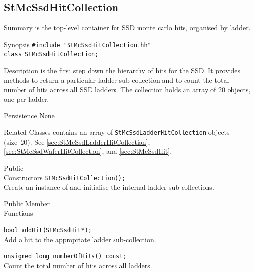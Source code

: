 \subsection{StMcSsdHitCollection}
 
\label{sec:StMcSsdHitCollection}
\begin{Entry}
\item[Summary]
     is the top-level container for SSD monte
    carlo hits, organised by ladder.

\item[Synopsis]
    \verb+#include "StMcSsdHitCollection.hh"+\\
    \verb+class StMcSsdHitCollection;+\\

\item[Description]
     is the first step down the hierarchy of hits
    for the SSD.  It provides methods to return a particular ladder
    sub-collection and to count the total number of hits across all SSD
    ladders.  The collection holds an array of 20
     objects, one per ladder.

\item[Persistence]
    None

\item[Related Classes]
     contains an array of
    {\tt StMcSsdLadderHitCollection} objects (size~20).  See
     \ref{sec:StMcSsdLadderHitCollection},
     \ref{sec:StMcSsdWaferHitCollection},
    and  \ref{sec:StMcSsdHit}.

\item[Public\\ Constructors]
    \verb+StMcSsdHitCollection();+\\
    Create an instance of  and
    initialise the internal ladder sub-collections.

\item[Public Member\\ Functions]

    \verb+bool addHit(StMcSsdHit*);+\\
    Add a hit to the appropriate ladder sub-collection.

    \verb+unsigned long numberOfHits() const;+\\
    Count the total number of hits across all ladders.


\end{Entry}
